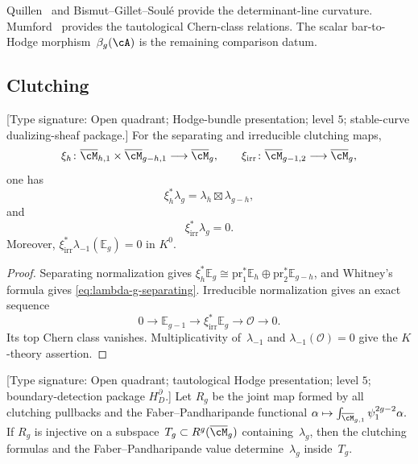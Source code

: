 \begin{remark}
\label{rem:no-clutching-needed}
Quillen~\cite{Quillen85} and Bismut--Gillet--Soul\'e
\cite{BGS88c} provide the determinant-line curvature.
Mumford~\cite{Mumford83} provides the tautological Chern-class
relations.  The scalar bar-to-Hodge morphism~$\beta_g(\cA)$ is the
remaining comparison datum.
\end{remark}

\subsection{Clutching}

\begin{proposition}
\label{prop:lambda-g-clutching}
\textup{[Type signature: Open quadrant; Hodge-bundle presentation;
level $5$; stable-curve dualizing-sheaf package.]}
For the separating and irreducible clutching maps,
\[
 \xi_h\colon\overline{\cM}_{h,1}\times
 \overline{\cM}_{g-h,1}\longrightarrow\overline{\cM}_g,
 \qquad
 \xi_{\mathrm{irr}}\colon\overline{\cM}_{g-1,2}
 \longrightarrow\overline{\cM}_g,
\]
one has
\begin{equation}
 \xi_h^*\lambda_g=\lambda_h\boxtimes\lambda_{g-h},
 \label{eq:lambda-g-separating}
\end{equation}
and
\begin{equation}
 \xi_{\mathrm{irr}}^*\lambda_g=0.
 \label{eq:lambda-g-nonseparating}
\end{equation}
Moreover,
$\xi_{\mathrm{irr}}^*\lambda_{-1}(\mathbb E_g)=0$ in $K^0$.
\end{proposition}

\begin{proof}
Separating normalization gives
$\xi_h^*\mathbb E_g\cong
\mathrm{pr}_1^*\mathbb E_h\oplus
\mathrm{pr}_2^*\mathbb E_{g-h}$, and Whitney's formula gives
\eqref{eq:lambda-g-separating}.  Irreducible normalization gives an
exact sequence
\[
 0\longrightarrow\mathbb E_{g-1}\longrightarrow
 \xi_{\mathrm{irr}}^*\mathbb E_g\longrightarrow\mathcal O
 \longrightarrow0.
\]
Its top Chern class vanishes.  Multiplicativity of~$\lambda_{-1}$
and $\lambda_{-1}(\mathcal O)=0$ give the $K$-theory assertion.
\end{proof}

\begin{proposition}
\label{prop:clutching-uniqueness}
\textup{[Type signature: Open quadrant; tautological Hodge
presentation; level $5$; boundary-detection package $H_D^{\partial}$.]}
Let $R_g$ be the joint map formed by all clutching pullbacks and the
Faber--Pandharipande functional
\(
 \alpha\mapsto\int_{\overline{\cM}_{g,1}}
 \psi_1^{2g-2}\alpha.
\)
If $R_g$ is injective on a subspace~$T_g\subset
R^g(\overline{\cM}_g)$ containing~$\lambda_g$, then the clutching
formulas and the Faber--Pandharipande value determine~$\lambda_g$
inside~$T_g$.
\end{proposition}


